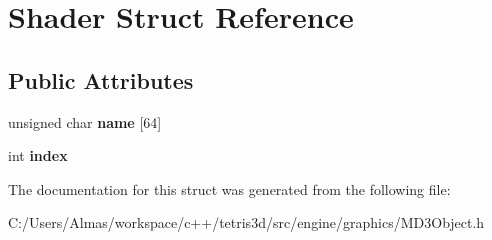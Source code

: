 \hypertarget{struct_shader}{\section{Shader Struct Reference}
\label{struct_shader}
}
\subsection*{Public Attributes}
\begin{DoxyCompactItemize}
\item 
\hypertarget{struct_shader_a5f3a439949224c2ba47040e5a76ad4a8}{unsigned char {\bfseries name} \mbox{[}64\mbox{]}}\label{struct_shader_a5f3a439949224c2ba47040e5a76ad4a8}

\item 
\hypertarget{struct_shader_a892997451bd8ce8294dee43f6d880424}{int {\bfseries index}}\label{struct_shader_a892997451bd8ce8294dee43f6d880424}

\end{DoxyCompactItemize}


The documentation for this struct was generated from the following file\-:\begin{DoxyCompactItemize}
\item 
C\-:/\-Users/\-Almas/workspace/c++/tetris3d/src/engine/graphics/M\-D3\-Object.\-h\end{DoxyCompactItemize}
